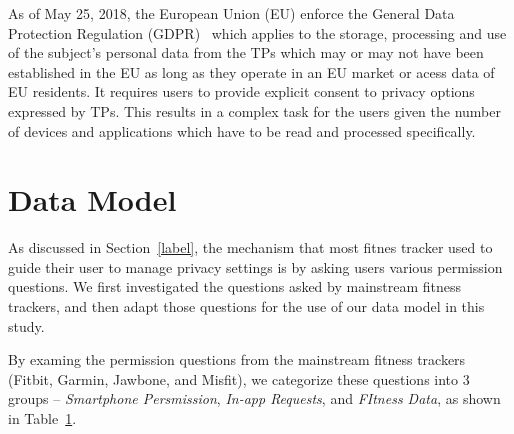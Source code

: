 As of May 25, 2018, the European Union (EU) enforce the General Data Protection Regulation (GDPR)~\cite{ref:GDPR} which applies to the storage, processing and use of the subject's personal data from the TPs which may or may not have been established in the EU as long as they operate in an EU market or acess data of EU residents. It requires users to provide explicit consent to privacy options expressed by TPs. This results in a complex task for the users given the number of devices and applications which have to be read and processed specifically.

\section{Data Model}
As discussed in Section~\ref{label}, the mechanism that most fitnes tracker used to guide their user to manage privacy settings is by asking users various permission questions. We first investigated the questions asked by mainstream fitness trackers, and then adapt those questions for the use of our data model in this study.

By examing the permission questions from the mainstream fitness trackers (Fitbit, Garmin, Jawbone, and Misfit), we categorize these questions into 3 groups -- \textit{Smartphone Persmission}, \textit{In-app Requests}, and \textit{FItness Data}, as shown in Table~\ref{}. 

